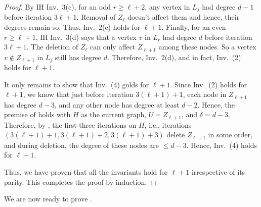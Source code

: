 \documentclass[11pt,letterpaper]{article}
\renewcommand{\geq}{\geqslant}
\renewcommand{\leq}{\leqslant}
\theoremstyle{definition}
\begin{document}
\begin{proof}
 By IH Inv.~3(c), for an odd $r \geq \ell+2$, any vertex in $L_j$ had degree $d-1$ before iteration $3\ell+1$. Removal of $Z_{\ell}$ doesn't affect them and hence, their degrees remain so. Thus, Inv.~2(c) holds for $\ell+1$. Finally, for an even $r\geq \ell+1$, IH Inv.~3(d) says that a vertex $v$ in $L_r$ had degree $d$ before iteration $3\ell+1$. The deletion of $Z_{\ell}$ can only affect $Z_{\ell+1}$ among these nodes. So a vertex $v\not\in Z_{\ell+1}$ in $L_j$ still has degree $d$. Therefore, Inv.~2(d), and in fact, Inv.~(2) holds for $\ell+1$.

It only remains to show that Inv.~(4) golds for $\ell+1$. Since Inv.~(2) holds for $\ell+1$, we know that just before iteration $3(\ell+1)+1$, each node in $Z_{\ell+1}$ has degree $d-3$, and any other node has degree at least $d-2$. Hence, the premise of  holds with $H$ as the current graph, $U=Z_{\ell+1}$, and $\delta=d-3$. Therefore, by , the first three iterations on $H$, i.e., iterations $(3(\ell+1)+1,3(\ell+1)+2,3(\ell+1)+3)$ delete $Z_{\ell+1}$ in some order, and during deletion, the degree of these nodes are $\leq d-3$. Hence, Inv.~(4) holds for $\ell+1$.

Thus, we have proven that all the invariants hold for $\ell+1$ irrespective of its parity. This completes the proof by induction.
\end{proof}
 
 
 

 We are now ready to prove .
\end{document}
